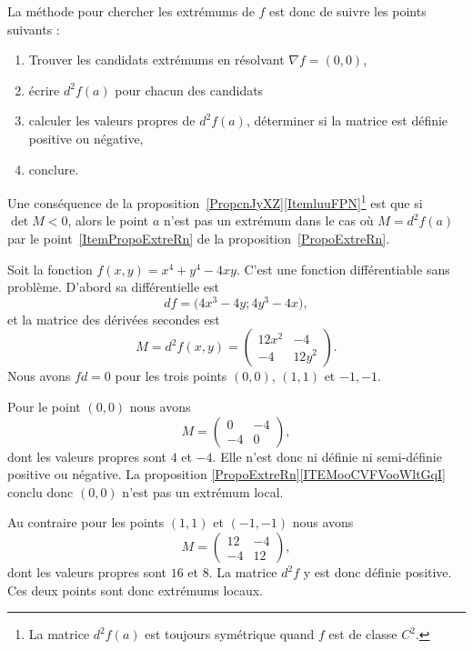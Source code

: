 La méthode pour chercher les extrémums de \( f\) est donc de suivre les points suivants :
\begin{enumerate}
	\item
	      Trouver les candidats extrémums en résolvant \( \nabla f=(0,0)\),
	\item
	      écrire \( d^2f(a)\) pour chacun des candidats
	\item
	      calculer les valeurs propres de \( d^2f(a)\), déterminer si la matrice est définie positive ou négative,
	\item
	      conclure.
\end{enumerate}

Une conséquence de la proposition~\ref{PropcnJyXZ}\ref{ItemluuFPN}\footnote{La matrice \( d^2f(a)\) est toujours symétrique quand \( f\) est de classe \( C^2\).} est que si \( \det M<0\), alors le point \( a\) n'est pas  un extrémum dans le cas où \( M=d^2f(a)\) par le point~\ref{ItemPropoExtreRn} de la proposition~\ref{PropoExtreRn}.

\begin{example}
	Soit la fonction \( f(x,y)=x^4+y^4-4xy\). C'est une fonction différentiable sans problème. D'abord sa différentielle est
	\begin{equation}
		df=\big(4x^3-4y;4y^3-4x),
	\end{equation}
	et la matrice des dérivées secondes est
	\begin{equation}
		M=d^2f(x,y)=\begin{pmatrix}
			12x^2 & -4    \\
			-4    & 12y^2
		\end{pmatrix}.
	\end{equation}
	Nous avons \( fd=0\) pour les trois points \( (0,0)\), \( (1,1)\) et \( -1,-1\).

	Pour le point \( (0,0)\) nous avons
	\begin{equation}
		M=\begin{pmatrix}
			0  & -4 \\
			-4 & 0
		\end{pmatrix},
	\end{equation}
	dont les valeurs propres sont \( 4\) et \( -4\). Elle n'est donc ni définie ni semi-définie positive ou négative. La proposition \ref{PropoExtreRn}\ref{ITEMooCVFVooWltGqI} conclu donc \( (0,0)\) n'est pas un extrémum local.

	Au contraire pour les points \( (1,1)\) et \( (-1,-1)\) nous avons
	\begin{equation}
		M=\begin{pmatrix}
			12 & -4 \\
			-4 & 12
		\end{pmatrix},
	\end{equation}
	dont les valeurs propres sont \( 16\) et \( 8\). La matrice \( d^2f\) y est donc définie positive. Ces deux points sont donc extrémums locaux.
\end{example}

